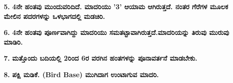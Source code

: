\begin{enumerate}
\begin{itemize}
\item[{\bf 5.}] \textbf{4ನೇ ಹಂತವು ಮುಂದುವರಿದಿದೆ. ಮಾದರಿಯು '3' ಆಯಾಮ ಆಗಿರುತ್ತದೆ. ನಂತರ ಗೆರೆಗಳ ಮೂಲಕ ಮೇಲಿನ ಪದರಗಳನ್ನು ಒಳಭಾಗದಲ್ಲಿ ಮಡಚಿರಿ.}
\begin{figure}[H]
\end{figure}

\item[{\bf 6.}] \textbf{4ನೇ ಹಂತವು ಪೂರ್ಣವಾಗಿದ್ದು ಮಾದರಿಯು ಸಮತಟ್ಟಾವಾಗಿರುತ್ತದೆ.\break ಮಾದರಿಯನ್ನು ತಿರುವು ಮುರುವು ಮಾಡಿರಿ.}

\item[{\bf 7.}] \textbf{ಮತ್ತೊಂದು ಬದಿಯಲ್ಲಿ 2ರಿಂದ 6ರ ವರಗಿನ ಹಂತಗಳನ್ನು ಪೂನಾವರ್ತನೆ ಮಾಡಬೇಕು.}
\begin{figure}[H]
\end{figure}

\item[{\bf 8.}] \textbf{ಪಕ್ಷಿ ಮಡಿಕೆ. (Bird Base) ಮುಗಿದಾಗ ಉಂಟಾಗುವ ಮಾದರಿ.}
\end{itemize}

\vfill\eject


\end{enumerate}
